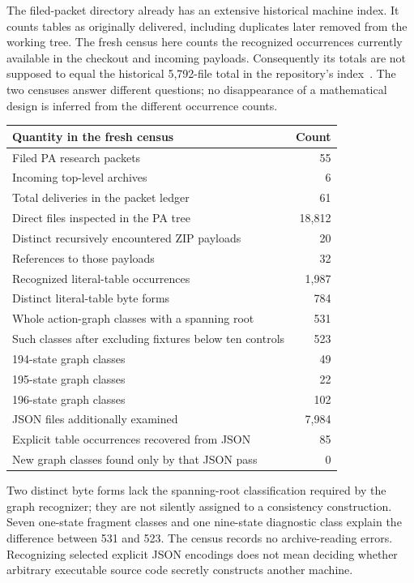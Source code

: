 \documentclass[11pt,letterpaper]{article}
\begin{document}
The filed-packet directory already has an extensive historical machine
index. It counts tables as originally delivered, including duplicates later
removed from the working tree. The fresh census here counts the recognized
occurrences currently available in the checkout and incoming payloads.
Consequently its totals are not supposed to equal the historical
5,792-file total in the repository's index~\cite{filed}. The two censuses
answer different questions; no disappearance of a mathematical design is
inferred from the different occurrence counts.

\begin{center}
\begin{tabular}{lr}\toprule
Quantity in the fresh census & Count\\\midrule
Filed PA research packets &55\\
Incoming top-level archives &6\\
Total deliveries in the packet ledger &61\\
Direct files inspected in the PA tree &18,812\\
Distinct recursively encountered ZIP payloads &20\\
References to those payloads &32\\
Recognized literal-table occurrences &1,987\\
Distinct literal-table byte forms &784\\
Whole action-graph classes with a spanning root &531\\
Such classes after excluding fixtures below ten controls &523\\
194-state graph classes &49\\
195-state graph classes &22\\
196-state graph classes &102\\
JSON files additionally examined &7,984\\
Explicit table occurrences recovered from JSON &85\\
New graph classes found only by that JSON pass &0\\\bottomrule
\end{tabular}
\end{center}

Two distinct byte forms lack the spanning-root classification required by
the graph recognizer; they are not silently assigned to a consistency
construction. Seven one-state fragment classes and one nine-state diagnostic
class explain the difference between 531 and 523. The census records no
archive-reading errors. Recognizing selected explicit JSON encodings does
not mean deciding whether arbitrary executable source code secretly
constructs another machine.
\end{document}
